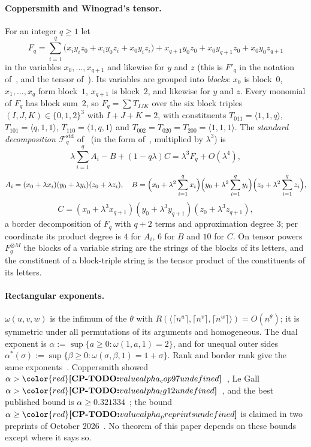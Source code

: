 \documentclass[11pt]{article}
\makeatletter
\theoremstyle{definition}
\theoremstyle{remark}
\DeclareRobustCommand{\CPTODO}[1]{{\color{red}\textbf{[CP-TODO:} #1\textbf{]}}}
\newcommand{\mat}[3]{\langle #1,#2,#3\rangle} %
\newcommand{\Fstd}{\mathcal{F}^{\mathrm{std}}_q} %
\newcommand{\alstar}{\alpha^*}                %
\newcommand{\cpv}[1]{\ifcsname cpv@#1\endcsname\csname cpv@#1\endcsname\else\CPTODO{value #1 undefined}\fi}
\newcommand{\AlphaVXXZ}{0.321334}%
\makeatother
\begin{document}
\paragraph{Coppersmith and Winograd's tensor.} For an integer $q\ge1$ let
\[
F_q=\sum_{i=1}^q\bigl(x_iy_iz_0+x_iy_0z_i+x_0y_iz_i\bigr)+x_{q+1}y_0z_0+x_0y_{q+1}z_0+x_0y_0z_{q+1}
\]
in the variables $x_0,\dots,x_{q+1}$ and likewise for $y$ and $z$ (this is $F'_q$ in the notation of~\cite[Section~3]{LG12}, and the tensor of~\cite[Section~7]{CW90}). Its variables are grouped into \emph{blocks}: $x_0$ is block~$0$, $x_1,\dots,x_q$ form block~$1$, $x_{q+1}$ is block~$2$, and likewise for $y$ and $z$. Every monomial of $F_q$ has block sum~$2$, so $F_q=\sum T_{IJK}$ over the six block triples $(I,J,K)\in\{0,1,2\}^3$ with $I+J+K=2$, with constituents $T_{011}=\mat11q$, $T_{101}=\mat q11$, $T_{110}=\mat1q1$ and $T_{002}=T_{020}=T_{200}=\mat111$. The \emph{standard decomposition} $\Fstd$ of~\cite[Section~7]{CW90} (in the form of~\cite[Section~3]{LG12}, multiplied by $\lambda^3$) is
\[
\lambda\sum_{i=1}^qA_i-B+(1-q\lambda)C=\lambda^3F_q+O(\lambda^4),
\]
\[
A_i=(x_0+\lambda x_i)(y_0+\lambda y_i)(z_0+\lambda z_i),\quad B=\Bigl(x_0+\lambda^2\sum_{i=1}^qx_i\Bigr)\Bigl(y_0+\lambda^2\sum_{i=1}^qy_i\Bigr)\Bigl(z_0+\lambda^2\sum_{i=1}^qz_i\Bigr),
\]
\[
C=(x_0+\lambda^3x_{q+1})(y_0+\lambda^3y_{q+1})(z_0+\lambda^3z_{q+1}),
\]
a border decomposition of $F_q$ with $q+2$ terms and approximation degree $3$; per coordinate its product degree is $4$ for $A_i$, $6$ for $B$ and $10$ for $C$. On tensor powers $F_q^{\otimes M}$ the blocks of a variable string are the strings of the blocks of its letters, and the constituent of a block-triple string is the tensor product of the constituents of its letters.

\paragraph{Rectangular exponents.} %
$\omega(u,v,w)$ is the infimum of the $\theta$ with $R(\mat{\lceil n^u\rceil}{\lceil n^v\rceil}{\lceil n^w\rceil})=O(n^{\theta})$; it is symmetric under all permutations of its arguments and homogeneous. The dual exponent is $\alpha:=\sup\{a\ge0:\omega(1,a,1)=2\}$, and for unequal outer sides $\alstar(\sigma):=\sup\{\beta\ge0:\omega(\sigma,\beta,1)=1+\sigma\}$. Rank and border rank give the same exponents~\cite{Bin80}. Coppersmith showed $\alpha>\cpv{alpha_cop97}$~\cite{Cop97}, Le Gall $\alpha>\cpv{alpha_lg12}$~\cite{LG12}, and the best published bound is $\alpha\ge\AlphaVXXZ$~\cite{VXXZ24}; the bound $\alpha\ge\cpv{alpha_preprints}$ is claimed in two preprints of October 2026~\cite{AvdBZ26,Uzn26}. No theorem of this paper depends on these bounds except where it says so.
\end{document}
